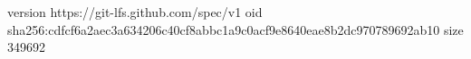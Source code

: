 version https://git-lfs.github.com/spec/v1
oid sha256:cdfcf6a2aec3a634206c40cf8abbc1a9c0acf9e8640eae8b2dc970789692ab10
size 349692
